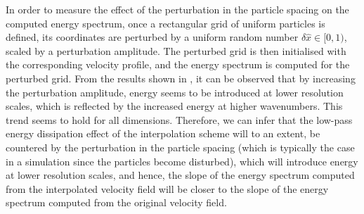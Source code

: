 In order to measure the effect of the perturbation in the particle spacing on the computed energy spectrum, once a rectangular grid of uniform particles is defined, its coordinates are perturbed by a uniform random number $\delta \hat{x} \in [0, 1)$, scaled by a perturbation amplitude. The perturbed grid is then initialised with the corresponding velocity profile, and the energy spectrum is computed for the perturbed grid. From the results shown in , it can be observed that by increasing the perturbation amplitude, energy seems to be introduced at lower resolution scales, which is reflected by the increased energy at higher wavenumbers. This trend seems to hold for all dimensions.
Therefore, we can infer that the low-pass energy dissipation effect of the interpolation scheme will to an extent, be countered by the perturbation in the particle spacing (which is typically the case in a simulation since the particles become disturbed), which will introduce energy at lower resolution scales, and hence, the slope of the energy spectrum computed from the interpolated velocity field will be closer to the slope of the energy spectrum computed from the original velocity field. 

